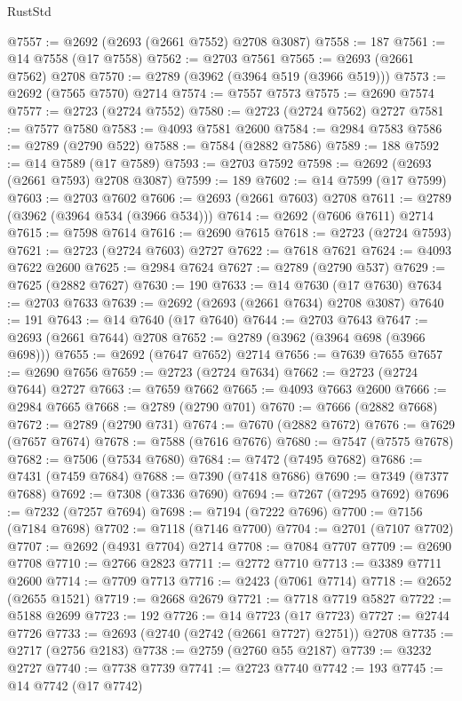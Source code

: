 \begin{lexlean}{RustStd}
\begin{coremodule}
@7557 := @2692 (@2693 (@2661 @7552) @2708 @3087)
@7558 := 187
@7561 := @14 @7558 (@17 @7558)
@7562 := @2703 @7561
@7565 := @2693 (@2661 @7562) @2708
@7570 := @2789 (@3962 (@3964 @519 (@3966 @519)))
@7573 := @2692 (@7565 @7570) @2714
@7574 := @7557 @7573
@7575 := @2690 @7574
@7577 := @2723 (@2724 @7552)
@7580 := @2723 (@2724 @7562) @2727
@7581 := @7577 @7580
@7583 := @4093 @7581 @2600
@7584 := @2984 @7583
@7586 := @2789 (@2790 @522)
@7588 := @7584 (@2882 @7586)
@7589 := 188
@7592 := @14 @7589 (@17 @7589)
@7593 := @2703 @7592
@7598 := @2692 (@2693 (@2661 @7593) @2708 @3087)
@7599 := 189
@7602 := @14 @7599 (@17 @7599)
@7603 := @2703 @7602
@7606 := @2693 (@2661 @7603) @2708
@7611 := @2789 (@3962 (@3964 @534 (@3966 @534)))
@7614 := @2692 (@7606 @7611) @2714
@7615 := @7598 @7614
@7616 := @2690 @7615
@7618 := @2723 (@2724 @7593)
@7621 := @2723 (@2724 @7603) @2727
@7622 := @7618 @7621
@7624 := @4093 @7622 @2600
@7625 := @2984 @7624
@7627 := @2789 (@2790 @537)
@7629 := @7625 (@2882 @7627)
@7630 := 190
@7633 := @14 @7630 (@17 @7630)
@7634 := @2703 @7633
@7639 := @2692 (@2693 (@2661 @7634) @2708 @3087)
@7640 := 191
@7643 := @14 @7640 (@17 @7640)
@7644 := @2703 @7643
@7647 := @2693 (@2661 @7644) @2708
@7652 := @2789 (@3962 (@3964 @698 (@3966 @698)))
@7655 := @2692 (@7647 @7652) @2714
@7656 := @7639 @7655
@7657 := @2690 @7656
@7659 := @2723 (@2724 @7634)
@7662 := @2723 (@2724 @7644) @2727
@7663 := @7659 @7662
@7665 := @4093 @7663 @2600
@7666 := @2984 @7665
@7668 := @2789 (@2790 @701)
@7670 := @7666 (@2882 @7668)
@7672 := @2789 (@2790 @731)
@7674 := @7670 (@2882 @7672)
@7676 := @7629 (@7657 @7674)
@7678 := @7588 (@7616 @7676)
@7680 := @7547 (@7575 @7678)
@7682 := @7506 (@7534 @7680)
@7684 := @7472 (@7495 @7682)
@7686 := @7431 (@7459 @7684)
@7688 := @7390 (@7418 @7686)
@7690 := @7349 (@7377 @7688)
@7692 := @7308 (@7336 @7690)
@7694 := @7267 (@7295 @7692)
@7696 := @7232 (@7257 @7694)
@7698 := @7194 (@7222 @7696)
@7700 := @7156 (@7184 @7698)
@7702 := @7118 (@7146 @7700)
@7704 := @2701 (@7107 @7702)
@7707 := @2692 (@4931 @7704) @2714
@7708 := @7084 @7707
@7709 := @2690 @7708
@7710 := @2766 @2823
@7711 := @2772 @7710
@7713 := @3389 @7711 @2600
@7714 := @7709 @7713
@7716 := @2423 (@7061 @7714)
@7718 := @2652 (@2655 @1521)
@7719 := @2668 @2679
@7721 := @7718 @7719 @5827
@7722 := @5188 @2699
@7723 := 192
@7726 := @14 @7723 (@17 @7723)
@7727 := @2744 @7726
@7733 := @2693 (@2740 (@2742 (@2661 @7727) @2751)) @2708
@7735 := @2717 (@2756 @2183)
@7738 := @2759 (@2760 @55 @2187)
@7739 := @3232 @2727
@7740 := @7738 @7739
@7741 := @2723 @7740
@7742 := 193
@7745 := @14 @7742 (@17 @7742)

\end{coremodule}
\end{lexlean}
